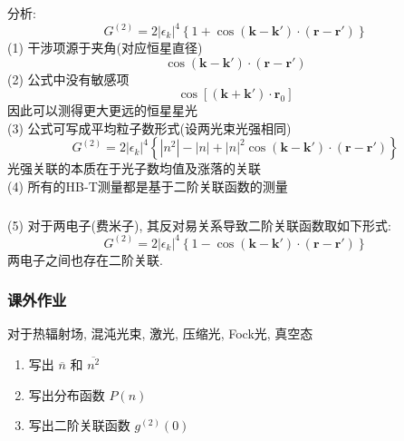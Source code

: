 \begin{frame} 
\frametitle{}
     分析: \\ 
     \[ G^{(2)} = 2 \left|\epsilon_k\right|^4 \left\{ 1+ \cos (\mathbf{k} - \mathbf{k}')\cdot (\mathbf{r}- \mathbf{r}')  \right\}\]
     (1) 干涉项源于夹角(对应恒星直径) \\ 
     \[\cos (\mathbf{k} - \mathbf{k}')\cdot (\mathbf{r}- \mathbf{r}') \]
     (2) 公式中没有敏感项
     \[ \cos\left[ (\mathbf{k} + \mathbf{k}') \cdot \mathbf{r}_0 \right] \]
     因此可以测得更大更远的恒星星光 \\ 
     (3) 公式可写成平均粒子数形式(设两光束光强相同)
     \[ G^{(2)} = 2 \left|\epsilon_k\right|^4 \left\{ \left|n^2\right| - \left|n\right|+ \left| n \right|^2\cos (\mathbf{k} - \mathbf{k}')\cdot (\mathbf{r}- \mathbf{r}')  \right\}\]
     光强关联的本质在于光子数均值及涨落的关联 \\
     (4) 所有的HB-T测量都是基于二阶关联函数的测量
\end{frame}

\begin{frame} 
\frametitle{}
     (5) 对于两电子(费米子), 其反对易关系导致二阶关联函数取如下形式:
     \[ G^{(2)} = 2 \left|\epsilon_k\right|^4 \left\{ 1- \cos (\mathbf{k} - \mathbf{k}')\cdot (\mathbf{r}- \mathbf{r}')  \right\}\]
     两电子之间也存在二阶关联.
\end{frame}
\begin{frame} 
    \frametitle{课外作业}
    对于热辐射场, 混沌光束, 激光, 压缩光, Fock光, 真空态
    \begin{enumerate}
        \item 写出 $\overline{n}$ 和 $\overline{n^2}$
        \item 写出分布函数 $P(n)$
        \item 写出二阶关联函数 $g^{(2)}(0)$
    \end{enumerate}
\end{frame}
